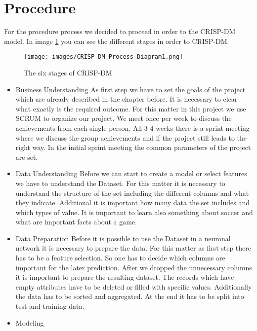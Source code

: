 \section{Procedure}

For the procedure process we decided to proceed in order to the CRISP-DM model. In image \ref{CRISImage} you can see the different stages in order to CRISP-DM.

\begin{figure}[h]
\centering
\texttt{[image: images/CRISP-DM\_Process\_Diagram1.png]}
\caption{The six stages of CRISP-DM \cite{CRISPDig:2012}}
\label{CRISImage}
\end{figure}

\begin{itemize}
\item Business Understanding \newline
As first step we have to set the goals of the project which are already described in the chapter before. It is necessary to clear what exactly is the required outcome. For this matter in this project we use SCRUM to organize our project. We meet once per week to discuss the achievements from each single person. All 3-4 weeks there is a sprint meeting where we discuss the group achievements and if the project still leads to the right way. In the initial sprint meeting the common parameters of the project are set. 
\item Data Understanding \newline
Before we can start to create a model or select features we have to understand the Dataset. For this matter it is necessary to understand the structure of the set including the different columns and what they indicate. Additional it is important how many data the set includes and which types of value. It is important to learn also something about soccer and what are important facts about a game. 
\item Data Preparation \newline
 Before it is possible to use the Dataset in a neuronal network it is necessary to prepare the data. For this matter as first step there has to be a feature selection. So one has to decide which columns are important for the later prediction. After we dropped the unnecessary columns it is important to prepare the resulting dataset. The records which have empty attributes have to be deleted or filled with specific values. Additionally the data has to be sorted and aggregated. At the end it has to be split into test and training data. 
 \item Modeling \newline

\end{itemize}
